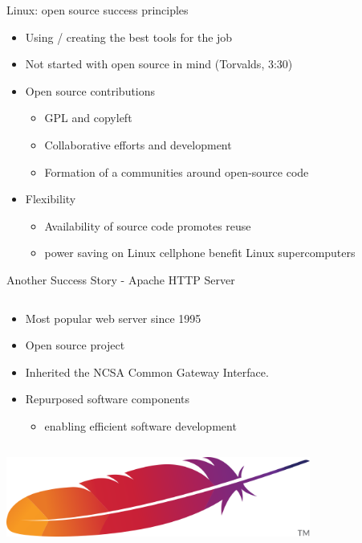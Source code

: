 


\begin{frame}{Linux: open source success principles}
  \begin{itemize}
    \item Using / creating the best tools for the job
    \item Not started with open source in mind (Torvalds, 3:30)
    \item Open source contributions
      \begin{itemize}
        \item GPL and copyleft
        \item Collaborative efforts and development
        \item Formation of a communities around open-source code
      \end{itemize}
    \item Flexibility
      \begin{itemize}
        \item Availability of source code promotes reuse
        \item power saving on Linux cellphone benefit Linux supercomputers~\cite[11:34]{zemlin}
      \end{itemize}
  \end{itemize}
\end{frame}



\begin{frame}{Another Success Story - Apache HTTP Server}
  \begin{column}{.5\textwidth}
    \begin{itemize}
      \item Most popular web server since 1995
      \item Open source project
      \item Inherited the NCSA Common Gateway Interface.
      \item Repurposed software components
        \begin{itemize}
          \item enabling efficient software development \cite[p. 17]{bisson}
        \end{itemize}
    \end{itemize}
  \end{column}
  \begin{column}{0.5\textwidth}\raggedleft
    \includegraphics[width = 0.75\textwidth]{apache.png}
  \end{column}
\end{frame}

